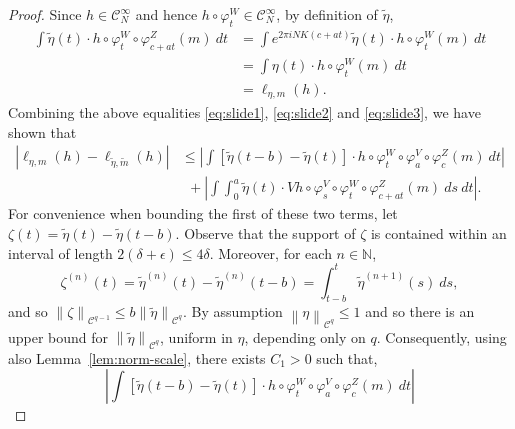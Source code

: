\documentclass[10pt,a4paper]{amsart}
\newcommand{\abs}[1]{\left|#1\right|} %
\newcommand{\bN}{\mathbb{N}} %
\newcommand{\cC}{\mathcal{C}} %
\newcommand{\dv}{V} %
\newcommand{\dw}{W} %
\newcommand{\dz}{Z} %
\newcommand{\norm}[1]{\left\|#1\right\|} %
\begin{document}
\begin{proof}
    Since \(h \in \cC^{\infty}_{N}\) and hence \(h \circ \varphi_{t}^{\dw}  \in \cC^{\infty}_{N}\), by definition of \(\tilde{\eta}\),
    \begin{equation}
        \label{eq:slide3}
        \begin{aligned}
            \int \tilde{\eta}(t) \cdot h \circ \varphi_{t}^{\dw} \circ \varphi_{c+at}^\dz (m) \ dt
             & = \int e^{2\pi i NK (c + at)} \tilde{\eta}(t) \cdot h \circ \varphi_{t}^{\dw} (m) \ dt \\
             & = \int \eta(t) \cdot h \circ \varphi_{t}^{\dw} (m) \ dt                               \\
             & = \ell_{\eta,m}(h).
        \end{aligned}
    \end{equation}
    Combining the above equalities \eqref{eq:slide1}, \eqref{eq:slide2} and \eqref{eq:slide3}, we have shown that
    \begin{equation}
        \label{eq:slide4}
        \begin{aligned}
            \abs{\ell_{\eta,m}(h) - \ell_{\tilde{\eta},\tilde{m}}(h)}
             & \leq \abs{\int \left[\tilde{\eta}(t-b) - \tilde{\eta}(t)\right] \cdot h \circ \varphi_{t}^{\dw} \circ \varphi_a^\dv \circ \varphi_c^\dz (m) \ dt} \\
             & \ \ + \abs{\int \int_{0}^{a} \tilde{\eta}(t) \cdot \dv h \circ \varphi_{s}^{\dv} \circ \varphi_{t}^{\dw} \circ \varphi_{c+at}^\dz (m) \ ds \ dt}.
        \end{aligned}
    \end{equation}
    For convenience when bounding the first of these two terms, let \(\zeta(t) = \tilde{\eta}(t) - \tilde{\eta}(t-b)\).
    Observe that the support of \(\zeta\) is contained within an interval of length \(2(\delta + \epsilon) \leq 4\delta\).
    Moreover, for each $n\in \bN$,  
    \[\zeta^{(n)}(t) = \tilde{\eta}^{(n)}(t) - \tilde{\eta}^{(n)}(t-b) = \int_{t-b}^{t} \tilde{\eta}^{(n+1)}(s) \ ds,\] and so \(\norm{\zeta}_{\cC^{q-1}} \leq b \norm{\tilde{\eta}}_{\cC^{q}}\).
    By assumption \(\norm{\eta}_{\cC^q} \leq 1\) and so there is an upper bound for \(\norm{\tilde{\eta}}_{\cC^{q}}\), uniform in \(\eta\), depending only on \(q\).
    Consequently, using also Lemma~\ref{lem:norm-scale}, there exists \(C_1>0\) such that,
    \begin{equation}
        \label{eq:slide5}
        \abs{\int \left[\tilde{\eta}(t-b) - \tilde{\eta}(t)\right] \cdot h \circ \varphi_{t}^{\dw} \circ \varphi_a^\dv \circ \varphi_c^\dz (m) \ dt} 

\end{equation}
\end{proof}
\end{document}
